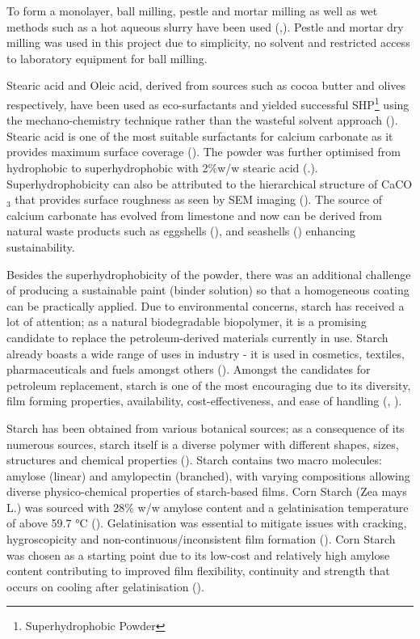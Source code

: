 To form a monolayer, ball milling, pestle and mortar milling as well as wet methods such as a hot aqueous slurry have been used (\cite{Cao},\cite{DeArmritt}). Pestle and mortar dry milling was used in this project due to simplicity, no solvent and restricted access to laboratory equipment for ball milling. 

Stearic acid and Oleic acid, derived from sources such as cocoa butter and olives respectively, have been used as eco-surfactants and yielded successful SHP\footnote{Superhydrophobic Powder} using the mechano-chemistry technique rather than the wasteful solvent approach (\cite{deepika}). Stearic acid is one of the most suitable surfactants for calcium carbonate as it provides maximum surface coverage (\cite{gilbert_petiraksakul_mathieson_2001}). The powder was further optimised from hydrophobic to superhydrophobic with 2\%w/w stearic acid (\cite{Vatsal}.). Superhydrophobicity can also be attributed to the hierarchical structure of CaCO$_3$ that provides surface roughness as seen by SEM imaging (\cite{zhang_hierarchial}). The source of calcium carbonate has evolved from limestone and now can be derived from natural waste products such as eggshells (\cite{thailandshells}), and seashells (\cite{fang_2019}) enhancing sustainability.
\par Besides the superhydrophobicity of the powder,  there was an additional challenge of producing a sustainable paint (binder solution) so that a homogeneous coating can be practically applied. Due to environmental concerns, starch has received a lot of attention; as a natural biodegradable biopolymer, it is a promising candidate to replace the petroleum-derived materials currently in use. Starch already boasts a wide range of uses in industry - it is used in cosmetics, textiles, pharmaceuticals and fuels amongst others (\cite{kaur_ariffin_bhat_karim_2012}).  Amongst the candidates for petroleum replacement, starch is one of the most encouraging due to its diversity, film forming properties, availability, cost-effectiveness, and ease of handling (\cite{dufresne}, \cite{Caoprep}).  
\par Starch has been obtained from various botanical sources; as a consequence of its numerous sources, starch itself is a diverse polymer with different shapes, sizes, structures and chemical properties (\cite{smith_2001}). Starch contains two macro molecules: amylose (linear) and amylopectin (branched), with varying compositions allowing diverse physico-chemical properties of starch-based films. Corn Starch (Zea mays L.) was sourced with  28\% w/w amylose content  and a gelatinisation temperature of above 59.7 °C (\cite{luchese_spada_tessaro_2017}). Gelatinisation was essential to mitigate issues with cracking, hygroscopicity and non-continuous/inconsistent film formation (\cite{ZOBEL1984285}). Corn Starch was chosen as a starting point due to its low-cost and relatively high amylose content contributing to improved film flexibility, continuity and strength that occurs on cooling after gelatinisation (\cite{Amylosebenefit}).
